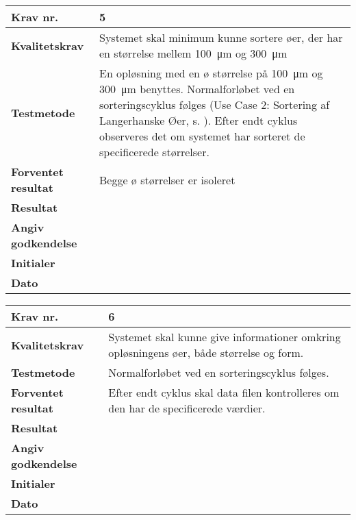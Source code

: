 	\begin{center}
		\begin{longtable}{ | m{4cm}| m{8.5cm}|} 
			\hline
			\textbf{Krav nr.} & 5 \\ 
			\hline
			\textbf{Kvalitetskrav} & Systemet skal minimum kunne sortere øer, der har en størrelse mellem  \SI{100}{\micro\metre}  og  \SI{300}{\micro\metre}  \\
			\hline
			\textbf{Testmetode} &   En opløsning med en ø størrelse på \SI{100}{\micro\metre}  og \SI{300}{\micro\metre} benyttes. Normalforløbet ved en sorteringscyklus følges (Use Case 2: Sortering af Langerhanske Øer, s. \pageref{uc:2}). Efter endt cyklus observeres det om systemet har sorteret de specificerede størrelser.  \\
			\hline
			\textbf{Forventet resultat}  & Begge ø størrelser er isoleret \\
			\hline
			\textbf{Resultat}  &    \\
			\hline
			\textbf{Angiv godkendelse} &     \\
			\hline
			\textbf{Initialer} &     \\
			\hline
			\textbf{Dato} &    \\
			\hline
		\end{longtable}
	\end{center}
    
 
    
	\begin{center}
		\begin{longtable}{ | m{4cm}| m{8.5cm}|} 
			\hline
			\textbf{Krav nr.} & 6 \\ 
			\hline
			\textbf{Kvalitetskrav} & Systemet skal kunne give informationer omkring opløsningens øer, både størrelse og form.  \\
			\hline
			\textbf{Testmetode} &   Normalforløbet ved en sorteringscyklus følges.   \\
			\hline
			\textbf{Forventet resultat}  & Efter endt cyklus skal data filen kontrolleres om den har de specificerede værdier. \\
			\hline
			\textbf{Resultat}  &    \\
			\hline
			\textbf{Angiv godkendelse} &     \\
			\hline
			\textbf{Initialer} &     \\
			\hline
			\textbf{Dato} &    \\
			\hline
		\end{longtable}
	\end{center}